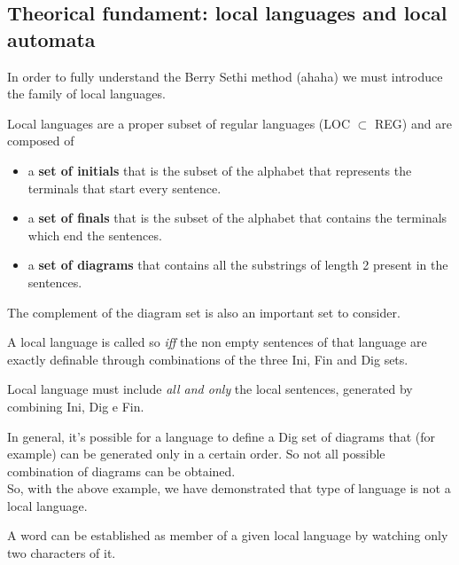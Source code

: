 		\subsection{Theorical fundament: local languages and local automata}
			In order to fully understand the Berry Sethi method (ahaha) we must introduce the family of local languages.
			\begin{definition}
				Local languages are a proper subset of regular languages (LOC $\subset$ REG) and are composed of
				\begin{itemize}
					\item a \textbf{set of initials} that is the subset of the alphabet that represents the terminals that start every sentence.
					\item a \textbf{set of finals} that is the subset of the alphabet that contains the terminals which end the sentences.
					\item a \textbf{set of diagrams} that contains all the substrings of length 2 present in the sentences.
				\end{itemize}
			\end{definition}

			The complement of the diagram set is also an important set to consider.\\
			\begin{corollary}
				A local language is called so \emph{iff} the non empty sentences of that language are exactly definable through combinations of the three Ini, Fin and Dig sets.
			\end{corollary}
			\begin{corollary}
				Local language must include \emph{all and only} the local sentences, generated by combining Ini, Dig e Fin.
			\end{corollary}

			In general, it's possible for a language to define a Dig set of diagrams that (for example) can be generated only in a certain order.
			So not all possible combination of diagrams can be obtained.\\
			So, with the above example, we have demonstrated that type of language is not a local language.
			\begin{property}
				A word can be established as member of a given local language by watching only two characters of it. 
			\end{property}
